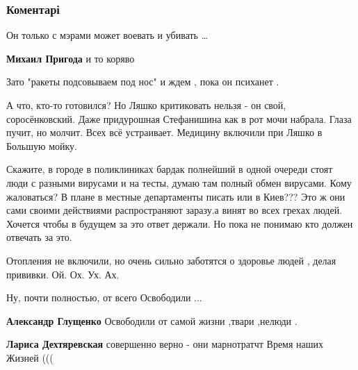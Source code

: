  
 
 
 
 
\subsubsection{Коментарі}

\begin{itemize} %

Он только с мэрами может воевать и убивать …

\begin{itemize} %
\textbf{Михаил Пригода} и то коряво
\end{itemize} %

Зато "ракеты подсовываем под нос" и ждем , пока он психанет .


А что, кто-то готовился? Но Ляшко критиковать нельзя - он свой, соросёнковский.
Даже придурошная Стефанишина как в рот мочи набрала. Глаза пучит, но молчит.
Всех всё устраивает. Медицину включили при Ляшко в Большую мойку.



Скажите, в городе в поликлиниках бардак полнейший в одной очереди стоят люди с
разными вирусами и на тесты, думаю там полный обмен вирусами. Кому жаловаться?
В плане в местные департаменты писать или в Киев??? Это ж они сами своими
действиями распространяют заразу.а винят во всех грехах людей. Хочется чтобы в
будущем за это ответ держали. Но пока не понимаю кто должен отвечать за это.


Отопления не включили, но очень сильно заботятся о здоровье людей , делая
прививки.  Ой. Ох. Ух. Ах.


Ну, почти полностью, от всего Освободили ...

\begin{itemize} %
\textbf{Александр Глущенко} Освободили от самой жизни ,твари ,нелюди .

\textbf{Лариса Дехтяревская} совершенно верно - они марнотратчт Время наших Жизней (((


\end{itemize}
\end{itemize}
